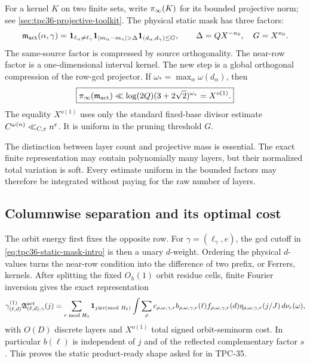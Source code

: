 For a kernel \(K\) on two finite sets, write \(\pi_{\infty}(K)\) for its bounded
projective norm; see \cref{sec:tpc36-projective-toolkit}.  The physical
static mask has three factors:
\begin{equation}
 \mathfrak m_{\rm act}(\alpha,\gamma)
 =\one_{\ell_\alpha\ne\ell_\gamma}
  \one_{|m_\alpha-m_\gamma|>\Delta}
  \one_{(d_\alpha,d_\gamma)\le G},
 \qquad
 \Delta=QX^{-\kappa_0},\quad G=X^{\kappa_0}.
 \label{eq:tpc36-static-mask-intro}
\end{equation}
The same-source factor is compressed by source orthogonality.  The
near-row factor is a one-dimensional interval kernel.  The new step is a
global orthogonal compression of the row-gcd projector.  If
\(\omega_*=\max_\alpha\omega(d_\alpha)\), then
\begin{equation}
 \boxed{
 \pi_{\infty}(\mathfrak m_{\rm act})
 \ll\log(2Q)(3+2\sqrt2)^{\omega_*}=X^{o(1)}.}
 \label{eq:tpc36-global-mask-intro}
\end{equation}
The equality \(X^{o(1)}\) uses only the standard fixed-base divisor
estimate \(C^{\omega(n)}\ll_{C,\varepsilon}n^\varepsilon\).  It is uniform in the
pruning threshold \(G\).

The distinction between layer count and projective mass is essential.
The exact finite representation may contain polynomially many layers, but
their normalized total variation is soft.  Every estimate uniform in the
bounded factors may therefore be integrated without paying for the raw
number of layers.

\subsection{Columnwise separation and its optimal cost}

The orbit energy first fixes the opposite row.  For
\(\gamma=(\ell_\gamma,e)\), the gcd cutoff in
\eqref{eq:tpc36-static-mask-intro} is then a unary \(d\)-weight.  Ordering
the physical \(d\)-values turns the near-row condition into the difference
of two prefix, or Ferrers, kernels.  After splitting the fixed
\(O_h(1)\) orbit residue cells, finite Fourier inversion gives the exact
representation
\begin{equation}
 \gamma_{(\ell,d)}^{(1)}
 \mathfrak A^{\rm act}_{(\ell,d),\gamma}(j)
 =\sum_{r\bmod H_0}\mathbf 1_{j\equiv r\!\!\!\pmod{H_0}}
 \int\sum_\rho
 c_{\rho,\omega,\gamma,r}
 b_{\rho,\omega,\gamma,r}(\ell)
 f_{\rho,\omega,\gamma,r}(d)
 \eta_{\rho,\omega,\gamma,r}(j/J)\,d\nu_r(\omega),
 \label{eq:tpc36-product-ready-intro}
\end{equation}
with \(O(D)\) discrete layers and \(X^{o(1)}\) total signed
orbit-seminorm cost.  In particular \(b(\ell)\) is independent of \(j\)
and of the reflected complementary factor \(s\).  This proves the static
product-ready shape asked for in TPC-35.

